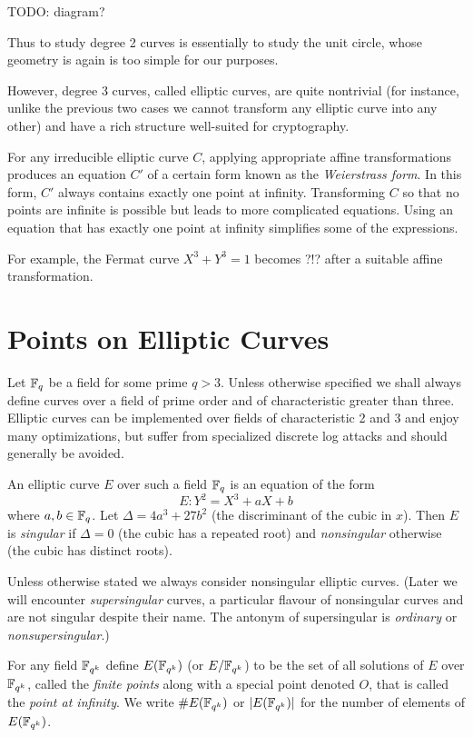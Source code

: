 TODO: diagram?

Thus to study degree 2 curves is essentially to study the unit circle,
whose geometry is again is too simple for our purposes.

However, degree 3 curves, called elliptic curves,
are quite nontrivial (for instance, unlike the previous two
cases we cannot transform any elliptic curve into
any other)
and have a rich structure well-suited for cryptography.

For any irreducible elliptic curve $C$,
applying appropriate affine transformations
produces an equation $C'$ of a certain form known
as the \emph{Weierstrass form}.
In this form, $C'$ always contains exactly one point at infinity.
Transforming $C$ so
that no points are infinite is
possible but leads to more complicated
equations. Using an equation that has
exactly one point at infinity simplifies some of the expressions.

For example, the Fermat curve $X^3 + Y^3 = 1$ becomes
?!? after a suitable affine transformation.

\section {Points on Elliptic Curves}

Let $\mathbb{F}_q$ be a field for some prime $q > 3$.
Unless otherwise specified we shall always
define curves over a field of prime order and of characteristic greater
than three.
Elliptic curves can be implemented over fields of characteristic 2 and 3
and enjoy many optimizations,
but suffer from specialized discrete log attacks and should generally
be avoided.

An elliptic curve $E$ over such a field $\mathbb{F}_q$ is an equation of the form
\[ E: Y^2 = X^3 + a X + b \]
where $a, b \in \mathbb{F}_q$.
Let $\Delta = 4 a^3 + 27b^2$ (the discriminant of the cubic in $x$). Then
$E$ is \emph{singular} if $\Delta = 0$ (the cubic has a repeated root)
and \emph{nonsingular} otherwise (the cubic has distinct roots).

Unless otherwise stated we always consider nonsingular elliptic curves.
(Later we will encounter \emph{supersingular} curves, a particular
flavour of nonsingular curves and are not singular despite their
name.
The antonym of supersingular is \emph{ordinary} or \emph{nonsupersingular}.)

For any field $\mathbb{F}_{q^k}$ define $E(\mathbb{F}_{q^k})$ (or $E/\mathbb{F}_{q^k}$)
to be the set of all solutions
of $E$ over $\mathbb{F}_{q^k}$, called the \emph{finite points}
along with a special point denoted $O$,
that is called the \emph{point at infinity}. We write $\#E(\mathbb{F}_{q^k})$ 
or $|E(\mathbb{F}_{q^k})|$ for
the number of elements of $E(\mathbb{F}_{q^k})$.


